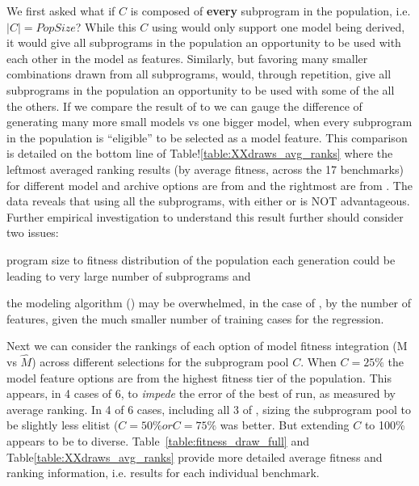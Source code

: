 We first asked what if  $C$ is composed of \textbf{every} subprogram in the population, i.e. $|C| = PopSize$?  While this $C$ using \FULL would only support one model being derived, it would give all subprograms in the population an opportunity to be used with each other in the model as features.  Similarly, but favoring many smaller combinations drawn from all subprograms, \DRAW would, through repetition,  give all subprograms in the population an opportunity to be used with some of the all the others.   If we compare the result of \DRAW to \FULL we can gauge the difference of generating many more small models vs one bigger model, when every subprogram in the population is ``eligible'' to be selected as a model feature.   This comparison is detailed on the bottom line of Table!\ref{table:XXdraws_avg_ranks} where the leftmost averaged ranking results (by average fitness, across the 17 benchmarks) for different model and archive options are from \DRAW and the rightmost are from \FULL. The data reveals that using all the subprograms, with either \FULL or \DRAW is NOT advantageous. Further empirical investigation to understand this result further should consider two issues: \begin{inparaenum} \item program size to fitness distribution of the population each generation could be leading to very large number of subprograms and \item the modeling algorithm (\REPTREE) may be overwhelmed, in the case of \FULL, by the number of features, given the much smaller number of training cases for the regression. \end{inparaenum}

Next we can consider the rankings of each option of model fitness integration (M vs $\hat M$) across different selections for the subprogram pool $C$.  When $C=25\%$ the model feature options are from the highest fitness tier of the population.  This appears, in 4 cases of 6, to \textit{impede} the error of the best of run, as measured by average ranking.  In 4 of 6 cases, including all 3 of \DRAW,  sizing the subprogram pool to be slightly less elitist ($C=50\% or C=75\%$ was better. But extending $C$ to 100\% appears to be to diverse.  Table~\ref{table:fitness_draw_full} and Table\ref{table:XXdraws_avg_ranks} provide more detailed average fitness and ranking information, i.e. results for each individual benchmark.  

